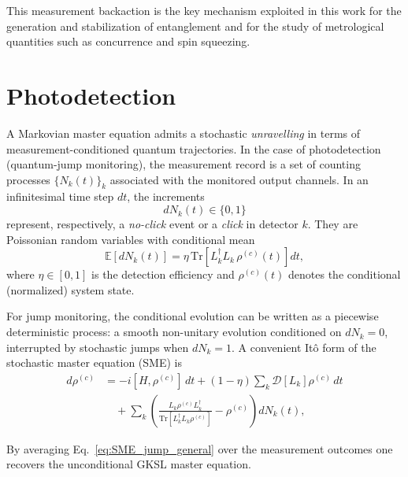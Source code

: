 This measurement backaction is the key mechanism exploited in this work for the generation
and stabilization of entanglement and for the study of metrological quantities such as
concurrence and spin squeezing.



\section{Photodetection}
\label{sec:photodetection}

A Markovian master equation admits a stochastic \emph{unravelling} in terms of
measurement-conditioned quantum trajectories. In the case of photodetection
(quantum-jump monitoring), the measurement record is a set of counting processes
$\{N_k(t)\}_k$ associated with the monitored output channels.
In an infinitesimal time step $dt$, the increments
\begin{equation}
	dN_k(t) \in \{0,1\}
\end{equation}
represent, respectively, a \emph{no-click} event or a \emph{click} in detector $k$.
They are Poissonian random variables with conditional mean
\begin{equation}
	\mathbb{E}\!\left[dN_k(t)\right]
	=
	\eta\,\mathrm{Tr}\!\left[L_k^\dagger L_k\,\rho^{(c)}(t)\right]dt ,
	\label{eq:poisson_mean_general}
\end{equation}
where $\eta\in[0,1]$ is the detection efficiency and $\rho^{(c)}(t)$ denotes the
conditional (normalized) system state.

For jump monitoring, the conditional evolution can be written as a piecewise
deterministic process: a smooth non-unitary evolution conditioned on $dN_k=0$,
interrupted by stochastic jumps when $dN_k=1$.
A convenient It\^o form of the stochastic master equation (SME) is
\begin{equation}
	\begin{aligned}
		d\rho^{(c)}
		&=
		-i[H,\rho^{(c)}]\,dt
		+ (1-\eta)\sum_k \mathcal{D}[L_k]\rho^{(c)}\,dt \\
		&\quad
		+ \sum_k
		\left(
		\frac{L_k\rho^{(c)}L_k^\dagger}{\mathrm{Tr}[L_k^\dagger L_k\rho^{(c)}]}
		-
		\rho^{(c)}
		\right)dN_k(t),
	\end{aligned}
	\label{eq:SME_jump_general}
\end{equation}

By averaging Eq.~\eqref{eq:SME_jump_general} over the measurement outcomes one
recovers the unconditional GKSL master equation.


